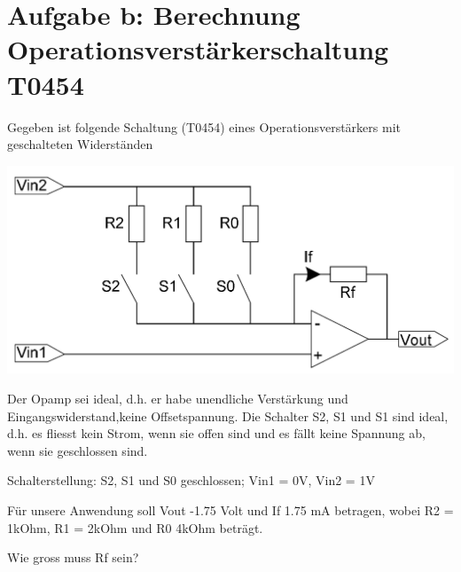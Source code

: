 \newpage
\section*{Aufgabe b: Berechnung Operationsverstärkerschaltung T0454}
Gegeben ist folgende Schaltung (T0454) eines Operationsverstärkers mit geschalteten Widerständen

\includegraphics[width=1.2\textwidth]{images/opAmp.png}

Der Opamp sei ideal, d.h. er habe unendliche Verstärkung und Eingangswiderstand,keine Offsetspannung. 
Die Schalter S2, S1 und S1 sind ideal, d.h. es fliesst kein Strom, wenn sie offen sind und es fällt keine Spannung ab, wenn sie geschlossen sind.

Schalterstellung: S2, S1 und S0 geschlossen; Vin1 = 0V, Vin2 = 1V

Für unsere Anwendung soll Vout -1.75 Volt und If 1.75 mA betragen, wobei R2 = 1kOhm, R1 = 2kOhm und R0 4kOhm beträgt.

Wie gross muss Rf sein?